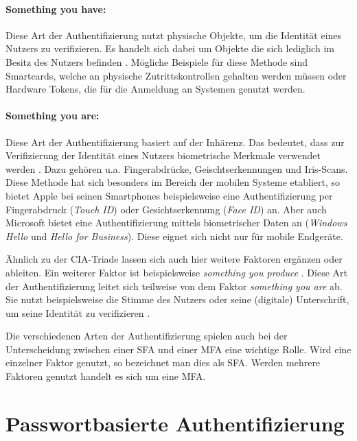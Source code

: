 \paragraph*{Something you have:}
Diese Art der Authentifizierung nutzt physische Objekte, um die Identität eines Nutzers zu verifizieren. Es handelt sich dabei um Objekte die sich lediglich im Besitz des Nutzers befinden \cite{boonkrong2012security}. Mögliche Beispiele für diese Methode sind Smartcards, welche an physische Zutrittskontrollen gehalten werden müssen oder Hardware Tokens, die für die Anmeldung an Systemen genutzt werden.

\paragraph*{Something you are:}
Diese Art der Authentifizierung basiert auf der Inhärenz. Das bedeutet, dass zur Verifizierung der Identität eines Nutzers biometrische Merkmale verwendet werden \cite{boonkrong2012security}. Dazu gehören u.a. Fingerabdrücke, Geischtserkennungen und Iris-Scans. Diese Methode hat sich besonders im Bereich der mobilen Systeme etabliert, so bietet Apple bei seinen Smartphones beispielsweise eine Authentifizierung per Fingerabdruck (\textit{Touch ID}) oder Gesichtserkennung (\textit{Face ID}) an. Aber auch Microsoft bietet eine Authentifizierung mittels biometrischer Daten an (\textit{Windows Hello} und \textit{Hello for Business}). Diese eignet sich nicht nur für mobile Endgeräte.

Ähnlich zu der CIA-Triade lassen sich auch hier weitere Faktoren ergänzen oder ableiten. Ein weiterer Faktor ist beispielsweise \textit{something you produce} \cite{boonkrong2012security}. Diese Art der Authentifizierung leitet sich teilweise von dem Faktor \textit{something you are} ab. Sie nutzt beispielsweise die Stimme des Nutzers oder seine (digitale) Unterschrift, um seine Identität zu verifizieren \cite{boonkrong2012security}. 

Die verschiedenen Arten der Authentifizierung spielen auch bei der Unterscheidung zwischen einer \ac{SFA} und einer  \ac{MFA} eine wichtige Rolle. Wird eine einzelner Faktor genutzt, so bezeichnet man dies als \ac{SFA}. Werden mehrere Faktoren genutzt handelt es sich um eine \ac{MFA}.

\section{Passwortbasierte Authentifizierung}\label{pw-auth}

